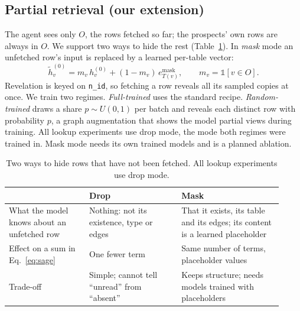 \documentclass{article}
\begin{document}
\subsection{Partial retrieval (our extension)}
The agent sees only $O$, the rows fetched so far; the prospects' own rows are always in $O$. We support two ways to hide the rest (Table~\ref{tab:hide}). In \emph{mask} mode an unfetched row's input is replaced by a learned per-table vector:
\begin{equation}
  \tilde h_v^{(0)} = m_v\, h_v^{(0)} + (1 - m_v)\, e^{\mathrm{mask}}_{T(v)}, \qquad m_v = \mathds{1}[v \in O].
  \label{eq:mask}
\end{equation}
Revelation is keyed on \texttt{n\_id}, so fetching a row reveals all its sampled copies at once. We train two regimes. \emph{Full-trained} uses the standard recipe. \emph{Random-trained} draws a share $p \sim U(0,1)$ per batch and reveals each distinct row with probability $p$, a graph augmentation that shows the model partial views during training. All lookup experiments use drop mode, the mode both regimes were trained in. Mask mode needs its own trained models and is a planned ablation.

\begin{table}[h]
  \centering
  \small
  \begin{tabular}{@{}p{0.27\linewidth}p{0.31\linewidth}p{0.34\linewidth}@{}}
    \toprule
    & Drop & Mask \\
    \midrule
    What the model knows about an unfetched row & Nothing: not its existence, type or edges & That it exists, its table and its edges; its content is a learned placeholder \\
    Effect on a sum in Eq.~\ref{eq:sage} & One fewer term & Same number of terms, placeholder values \\
    Trade-off & Simple; cannot tell ``unread'' from ``absent'' & Keeps structure; needs models trained with placeholders \\
    \bottomrule
  \end{tabular}
  \caption{Two ways to hide rows that have not been fetched. All lookup experiments use drop mode.}
  \label{tab:hide}
\end{table}
\end{document}
